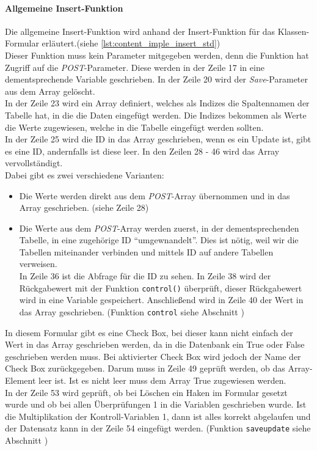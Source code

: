 \paragraph{Allgemeine Insert-Funktion\\}
Die allgemeine Insert-Funktion wird anhand der Insert-Funktion für das Klassen-Formular erläutert.(siehe \autoref{lst:content_imple_insert_std})\\
Dieser Funktion muss kein Parameter mitgegeben werden, denn die Funktion hat Zugriff auf die \textit{POST}-Parameter. Diese werden in der Zeile 17 in eine dementsprechende Variable geschrieben. In der Zeile 20 wird der \textit{Save}-Parameter aus dem Array gelöscht.\\
In der Zeile 23 wird ein Array definiert, welches als Indizes die Spaltennamen der Tabelle hat, in die die Daten eingefügt werden. Die Indizes bekommen als Werte die Werte zugewiesen, welche in die Tabelle eingefügt werden sollten.\\
In der Zeile 25 wird die ID in das Array geschrieben, wenn es ein Update ist, gibt es eine ID, andernfalls ist diese leer. In den Zeilen 28 - 46 wird das Array vervollständigt.\\
Dabei gibt es zwei verschiedene Varianten:
\begin{itemize}
	\item Die Werte werden direkt aus dem \textit{POST}-Array übernommen und in das Array geschrieben. (siehe Zeile 28)
	\item Die Werte aus dem \textit{POST}-Array werden zuerst, in der dementsprechenden Tabelle, in eine zugehörige ID \enquote{umgewnandelt}. Dies ist nötig, weil wir die Tabellen miteinander verbinden und mittels ID auf andere Tabellen verweisen.\\
	In Zeile 36 ist die Abfrage für die ID zu sehen. In Zeile 38 wird der Rückgabewert mit der Funktion \texttt{control()} überprüft, dieser Rückgabewert wird in eine Variable gespeichert. Anschließend wird in Zeile 40 der Wert in das Array geschrieben. (Funktion \texttt{control} siehe Abschnitt )
\end{itemize}
In diesem Formular gibt es eine Check Box, bei dieser kann nicht einfach der Wert in das Array geschrieben werden, da in die Datenbank ein True oder False geschrieben werden muss. Bei aktivierter Check Box wird jedoch der Name der Check Box zurückgegeben. Darum muss in Zeile 49 geprüft werden, ob das Array-Element leer ist. Ist es nicht leer muss dem Array True zugewiesen werden.\\
In der Zeile 53 wird geprüft, ob bei Löschen ein Haken im Formular gesetzt wurde und ob bei allen Überprüfungen 1 in die Variablen geschrieben wurde. Ist die Multiplikation der Kontroll-Variablen 1, dann ist alles korrekt abgelaufen und der Datensatz kann in der Zeile 54 eingefügt werden. (Funktion \texttt{saveupdate} siehe Abschnitt )

